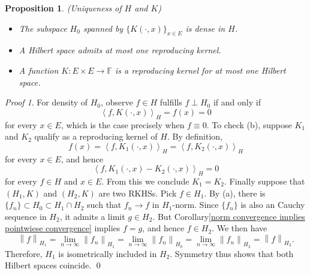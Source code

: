 \documentclass[a4paper,12pt]{article}
\newtheorem{prp}[thm]{Proposition}
\theoremstyle{remark}
\newtheorem*{prf}{Proof}
\theoremstyle{definition}
\theoremstyle{definition}
\theoremstyle{definition}
\newcommand{\ip}[2]{\left<#1, #2 \right>}
\newcommand{\norm}[1]{\left\| #1 \right\|}
\begin{document}
\begin{prp}(Uniqueness of \( H \) and \( K \))\label{Density and Unique of RKHS}

	\begin{itemize}
		\item[(a)] The subspace \( H_0 \) spanned by \( \{K(\cdot ,x) \} _{x \in E} \) is dense in \( H \).
		\item[(b)] A Hilbert space admits at most one reproducing kernel.
		\item[(c)] A function \( K:E \times E \to \mathbb{F} \) is a reproducing kernel for at most one Hilbert space.
	\end{itemize}
\end{prp}
\begin{prf}
	For density of \( H_0 \), observe \( f \in H \) fulfills \( f \perp H_0 \) if and only if
	\begin{equation*}
		\ip{f}{K(\cdot ,x)}_H = f(x)=0
	\end{equation*}
	for every \( x \in E \), which is the case precisely when \( f \equiv 0 \). To check (b), suppose \( K_1 \) and \( K_2 \) qualify as a reproducing kernel of \( H \). By definition,
	\begin{equation*}
		f(x) = \ip{f}{K_1(\cdot ,x)}_H =\ip{f}{K_2(\cdot ,x)}_H
	\end{equation*}
	for every \( x \in E \), and hence
	\begin{equation*}
		\ip{f}{K_1(\cdot ,x)- K_2(\cdot ,x)}_H = 0
	\end{equation*}
	for every \( f \in H \) and \( x \in E \). From this we conclude \( K_1 =K_2 \).
	Finally suppose that \( (H_1,K) \) and \( (H_2,K) \) are two RKHSs.
	Pick \( f \in H_1 \). By (a), there is \( \{f_n\} \subset H_0 \subset H_1 \cap H_2 \) such that \( f_n \to f \) in \( H_1 \)-norm. Since \( \{f_n\} \) is also an Cauchy sequence in \( H_2 \), it admits a limit \( g \in H_2 \). But Corollary\ref{norm convergence implies pointwiese convergence} implies \( f=g \), and hence \( f \in H_2 \). We then have
	\begin{equation*}
		\norm{f}_{H_1}
		= \lim_{n \to \infty} \norm{f_n}_{H_1}
		=\lim_{n \to \infty} \norm{f_n}_{H_0}
		=\lim_{n \to \infty} \norm{f_n}_{H_2}
		=\norm{f}_{H_2}.
	\end{equation*}
	Therefore, \( H_1 \) is isometrically included in \( H_2 \). Symmetry thus shows that both Hilbert spaces coincide.
	\qed\end{prf}
\end{document}
